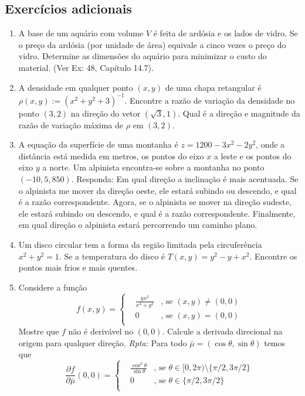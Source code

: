 \documentclass[11pt]{article}
\begin{document}
   \subsection{Exercícios adicionais}
     \begin{enumerate}
      \item A base de um aquário com volume $V$ é feita de ardósia e os lados de vidro. Se o preço da ardósia (por unidade de área)
      equivale a cinco vezes o preço do vidro. 
      Determine as dimensões do aquário para minimizar o custo do material. (Ver Ex: 48, Capítulo 14.7).
      
       \item A densidade em qualquer ponto $(x,y)$ de uma chapa retangular é $\rho(x,y):=(x^{2}+y^{2}+3)^{-1}$. 
       Encontre a razão de variação da densidade no ponto $(3,2)$ na direção do vetor $(\sqrt{3}, 1)$. Qual é a direção e magnitude da razão de variação máxima de $\rho$ em $(3,2)$.
       
       \item 
      A equação da superfície de uma montanha é $z=1200-3x^{2}-2y^{2}$, 
      onde a distância está medida em metros, os pontos do eixo $x$ a leste e os pontos do eixo $y$ a norte. Um alpinista encontra-se sobre a montanha no ponto $(-10, 5, 850)$. Responda: Em qual direção a inclinação é mais acentuada. Se o alpinista me mover da direção oeste, ele 
      estará subindo ou descendo, e qual é a razão correspondente. Agora, se o alpinista se mover na direção sudeste,    ele 
      estará subindo ou descendo, e qual é a razão correspondente.
      Finalmente, em qual direção o alpinista estará percorrendo um caminho plano.       
     
     \item Um disco circular tem a forma da região limitada pela circuferência $x^{2}+y^{2}=1$. Se a temperatura do disco é 
     $T(x,y)=y^{2}-y+x^2$. Encontre os pontos mais frios e mais quentes.
     
      \item 
      Considere a função 
     $$
    f(x,y)= \left\{  
            \begin{array}{lll}
    & \frac{yx^{2}}{x^{4}+y^2} &\text{, se } (x,y)\neq (0,0) \\
    & 0 &\text{, se } (x,y)=(0,0)  \\
            \end{array}
            \right. 
    $$      
    Mostre que $f$ não é derivável no $(0,0)$.
    Calcule a derivada direcional na origem para qualquer direção. 
    {\it Rpta: }Para todo  $\bar{\mu}=(\cos \theta, \sin \theta)$
    temos que 
    $$
    \frac{\partial f}{\partial \bar{\mu}}(0,0)= \left\{  
            \begin{array}{lll}
    & \frac{\cos^{2} \theta}{\sin \theta} &\text{, se } 
    \theta \in [0,2\pi) \setminus \{\pi/2, 3\pi/2\} \\
    & 0 &\text{, se } \theta \in \{\pi/2, 3\pi/2\}  \\
            \end{array}
            \right. 
    $$      
      

\end{enumerate}
\end{document}
